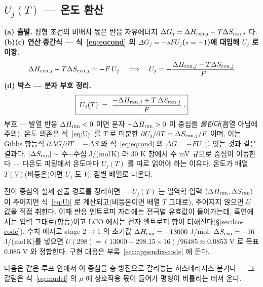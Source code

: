 \subsection{$U_j(T)$ --- 온도 환산}\label{sec:center-Uj}
\textbf{(a) 출발.} 평형 조건의 비배치 몫은 반응 자유에너지 $\Delta G_j=\Delta H_{\mathrm{rxn},j}-T\Delta S_{\mathrm{rxn},j}$ 다.
\textbf{(b)(c) 연산$\cdot$중간식 --- 식~\eqref{eq:eqcond} 의 $\Delta G_j=-sFU_j$($s=+1$)에 대입해 $U_j$ 로 이항.}
\begin{equation}
\Delta H_{\mathrm{rxn},j}-T\Delta S_{\mathrm{rxn},j}=-F\,U_j
\quad\Longrightarrow\quad
U_j=-\frac{\Delta H_{\mathrm{rxn},j}-T\Delta S_{\mathrm{rxn},j}}{F}
\label{eq:Ujmid}
\end{equation}
\textbf{(d) 박스 --- 분자 부호 정리.}
\begin{equation}
\boxed{\;U_j(T)\;=\;\frac{-\Delta H_{\mathrm{rxn},j}+T\,\Delta S_{\mathrm{rxn},j}}{F}\;.}
\label{eq:Uj}
\end{equation}
부호 --- 발열 반응
$\Delta H_{\mathrm{rxn}}<0$ 이면 분자 $-\Delta H_{\mathrm{rxn}}>0$ 이 중심을 \emph{올린다}(흡열 아님에 주의). 온도 의존은 식~\eqref{eq:Uj} 를
$T$ 로 미분한 $\partial U_j/\partial T=\Delta S_{\mathrm{rxn},j}/F$ 이며, 이는 Gibbs 항등식 $\partial\Delta G/\partial T=-\Delta S$ 와
식~\eqref{eq:eqcond} 의 $\Delta G=-FU$ 를 잇는 것과 같은 결과다. $|\Delta S_{\mathrm{rxn}}|\sim$ 수$\sim$수십 J/(mol\,K) 라 $30$ K
창에서 수 mV 규모로 중심이 이동한다 --- 다온도 피팅에서 온도마다 $U_j(T)$ 를 따로 읽어야 하는 이유다. 온도가 배열
$T(V)$(비등온)이면 $U_j$ 도 $V_n$ 점별 배열로 나온다.

전이 중심의 실제 산출 경로를 정리하면 --- $U_j(T)$ 는 열역학 입력 $(\Delta H_{\mathrm{rxn}},\Delta S_{\mathrm{rxn}})$ 이 주어지면
식~\eqref{eq:Uj} 로 계산되고(비등온이면 배열 $T$ 그대로), 주어지지 않으면 $U$ 값을 직접 취한다. 이때
반응 엔트로피 자리에는 전극별 유효값이 들어가는데, 흑연에서는 입력 그대로(항등)이고 LCO 에서는 전자
엔트로피 항이 더해진다(\S\ref{sec:lco-code}). 수치 예시로 stage $2\to1$ 의 초기값
$\Delta H_{\mathrm{rxn}}=-13000$ J/mol, $\Delta S_{\mathrm{rxn}}=-16$ J/(mol\,K)를 넣으면
$U(298)=(13000-298.15\times16)/96485\approx0.0853$ V 로 목표 $0.085$ V 와 정합한다. 구현 대응은
부록~\ref{sec:appendix-code} 에 둔다.

다음은 같은 루프 안에서 이 중심을 충$\cdot$방전으로 갈라놓는 히스테리시스 분기다 --- 그 갈림은 식~\eqref{eq:mudef} 의
$\mu$ 에 상호작용 몫이 들어가 평형이 비틀리는 데서 온다.

